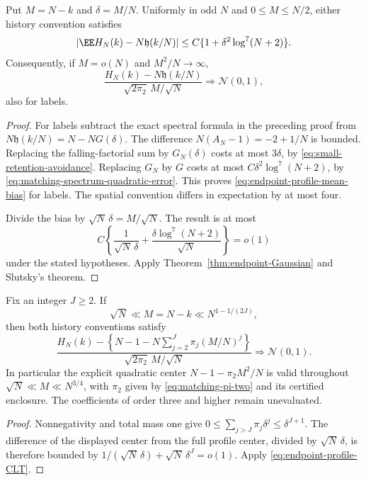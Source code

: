 \documentclass[11pt,letterpaper]{article}
\begin{document}
\begin{theorem}
\label{thm:endpoint-profile-centering}
Put $M=N-k$ and $\delta=M/N$. Uniformly in odd $N$ and
$0\le M\le N/2$, either history convention satisfies
\begin{equation}\label{eq:endpoint-profile-mean-bias}
 |\EE H_N(k)-N\mathfrak h(k/N)|
       \le C\{1+\delta^2\log^7(N+2)\}.
\end{equation}
Consequently, if $M=o(N)$ and $M^2/N\to\infty$,
\begin{equation}\label{eq:endpoint-profile-CLT}
 \frac{H_N(k)-N\mathfrak h(k/N)}
                  {\sqrt{2\pi_2}\,M/\sqrt N}
                  \Longrightarrow\mathcal N(0,1),
\end{equation}
also for labels.
\end{theorem}
\begin{proof}
For labels subtract the exact spectral formula in the preceding
proof from $N\mathfrak h(k/N)=N-NG(\delta)$.
The difference $N(A_N-1)=-2+1/N$ is bounded.
Replacing the falling-factorial sum by $G_N(\delta)$ costs
at most $3\delta$, by \eqref{eq:small-retention-avoidance}.
Replacing $G_N$ by $G$ costs at most
$C\delta^2\log^7(N+2)$, by
\eqref{eq:matching-spectrum-quadratic-error}.
This proves \eqref{eq:endpoint-profile-mean-bias} for labels.
The spatial convention differs in expectation by at most four.

Divide the bias by $\sqrt N\,\delta=M/\sqrt N$.
The result is at most
\[
 C\left\{\frac1{\sqrt N\,\delta}
                  +\frac{\delta\log^7(N+2)}{\sqrt N}\right\}=o(1)
\]
under the stated hypotheses. Apply
Theorem~\ref{thm:endpoint-Gaussian} and Slutsky's theorem.
\end{proof}

\begin{corollary}
\label{cor:endpoint-polynomial-centering}
Fix an integer $J\ge2$. If
\[
 \sqrt N\ll M=N-k\ll N^{1-1/(2J)},
\]
then both history conventions satisfy
\begin{equation}\label{eq:endpoint-polynomial-CLT}
 \frac{H_N(k)-
       \left\{N-1-N\sum_{j=2}^J\pi_j(M/N)^j\right\}}
              {\sqrt{2\pi_2}\,M/\sqrt N}
          \Longrightarrow\mathcal N(0,1).
\end{equation}
In particular the explicit quadratic center
$N-1-\pi_2 M^2/N$ is valid throughout
$\sqrt N\ll M\ll N^{3/4}$, with $\pi_2$ given by
\eqref{eq:matching-pi-two} and its certified enclosure.
The coefficients of order three and higher remain unevaluated.
\end{corollary}
\begin{proof}
Nonnegativity and total mass one give
$0\le\sum_{j>J}\pi_j\delta^j\le\delta^{J+1}$.
The difference of the displayed center from the full profile
center, divided by $\sqrt N\,\delta$, is therefore bounded by
$1/(\sqrt N\,\delta)+\sqrt N\,\delta^J=o(1)$.
Apply \eqref{eq:endpoint-profile-CLT}.
\end{proof}
\end{document}
